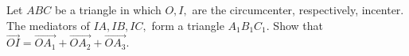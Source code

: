 Let $ ABC $ be a triangle in which $ O,I, $ are the circumcenter, respectively, incenter. The mediators of $ IA,IB,IC, $ form a triangle $ A_1B_1C_1. $ Show that $ \overrightarrow{OI}=\overrightarrow{OA_1} +\overrightarrow{OA_2} +\overrightarrow{OA_3} . $